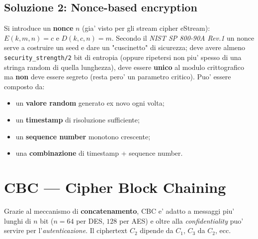 \subsection{Soluzione 2: Nonce-based encryption}
Si introduce un \textbf{nonce} $ n $ (gia' visto per gli stream cipher eStream): $ E(k, m, n) = c $ e $ D(k, c, n) = m $. Secondo il \textit{NIST SP 800-90A Rev.1} un nonce serve a costruire un seed e dare un "cuscinetto" di sicurezza; deve avere almeno \texttt{security\_strength/2} bit di entropia (oppure ripetersi non piu' spesso di una stringa random di quella lunghezza), deve essere \textbf{unico} al modulo crittografico ma \textbf{non} deve essere segreto (resta pero' un parametro critico). Puo' essere composto da:
\begin{itemize}
  \item un \textbf{valore random} generato ex novo ogni volta;
  \item un \textbf{timestamp} di risoluzione sufficiente;
  \item un \textbf{sequence number} monotono crescente;
  \item una \textbf{combinazione} di timestamp + sequence number.
\end{itemize}

\section{CBC — Cipher Block Chaining}
Grazie al meccanismo di \textbf{concatenamento}, CBC e' adatto a messaggi piu' lunghi di $ n $ bit ($ n = 64 $ per DES, $ 128 $ per AES) e oltre alla \textit{confidentiality} puo' servire per l'\textit{autenticazione}. Il ciphertext $ C_2 $ dipende da $ C_1 $, $ C_3 $ da $ C_2 $, ecc.

